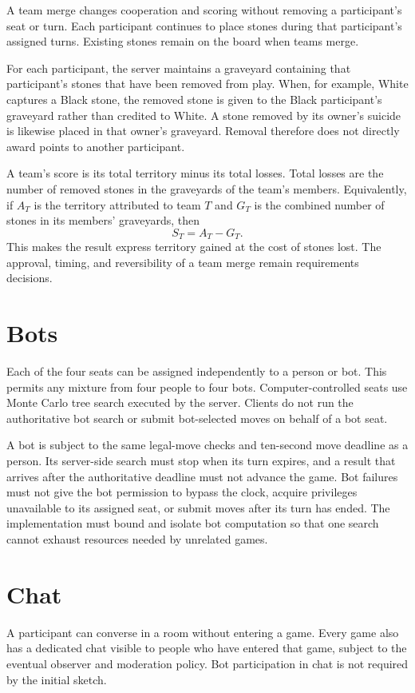 \documentclass[11pt,oneside]{book}
\begin{document}
A team merge changes cooperation and scoring without removing a participant's seat or turn. Each participant continues to place stones during that participant's assigned turns. Existing stones remain on the board when teams merge.

For each participant, the server maintains a graveyard containing that participant's stones that have been removed from play. When, for example, White captures a Black stone, the removed stone is given to the Black participant's graveyard rather than credited to White. A stone removed by its owner's suicide is likewise placed in that owner's graveyard. Removal therefore does not directly award points to another participant.

A team's score is its total territory minus its total losses. Total losses are the number of removed stones in the graveyards of the team's members. Equivalently, if \(A_T\) is the territory attributed to team \(T\) and \(G_T\) is the combined number of stones in its members' graveyards, then
\[
  S_T = A_T - G_T.
\]
This makes the result express territory gained at the cost of stones lost. The approval, timing, and reversibility of a team merge remain requirements decisions.

\section{Bots}
Each of the four seats can be assigned independently to a person or bot. This permits any mixture from four people to four bots. Computer-controlled seats use Monte Carlo tree search executed by the server. Clients do not run the authoritative bot search or submit bot-selected moves on behalf of a bot seat.

A bot is subject to the same legal-move checks and ten-second move deadline as a person. Its server-side search must stop when its turn expires, and a result that arrives after the authoritative deadline must not advance the game. Bot failures must not give the bot permission to bypass the clock, acquire privileges unavailable to its assigned seat, or submit moves after its turn has ended. The implementation must bound and isolate bot computation so that one search cannot exhaust resources needed by unrelated games.

\section{Chat}
A participant can converse in a room without entering a game. Every game also has a dedicated chat visible to people who have entered that game, subject to the eventual observer and moderation policy. Bot participation in chat is not required by the initial sketch.
\end{document}

